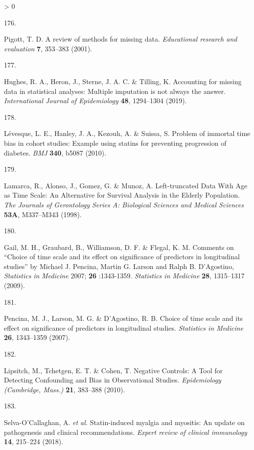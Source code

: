 \documentclass[a4paper, twoside]{templates/ociamthesis}
\newlength{\cslhangindent}
\newlength{\csllabelwidth}
\newenvironment{CSLReferences}[3] %
 {%
  \setlength{\parindent}{0pt}
  \ifodd #1 \everypar{\setlength{\hangindent}{\cslhangindent}}\ignorespaces\fi
  \ifnum #2 > 0
  \setlength{\parskip}{#2\baselineskip}
  \fi
 }%
 {}
\newcommand{\CSLLeftMargin}[1]{\parbox[t]{\maxof{\widthof{#1}}{\csllabelwidth}}{#1}}
\newcommand{\CSLRightInline}[1]{\parbox[t]{\linewidth - \csllabelwidth}{#1}}
\begin{document}
\begin{CSLReferences}{0}{0}
\leavevmode\hypertarget{ref-pigott2001review}{}%
\CSLLeftMargin{176. }
\CSLRightInline{Pigott, T. D. A review of methods for missing data. \emph{Educational research and evaluation} \textbf{7}, 353--383 (2001).}

\leavevmode\hypertarget{ref-hughes2019}{}%
\CSLLeftMargin{177. }
\CSLRightInline{Hughes, R. A., Heron, J., Sterne, J. A. C. \& Tilling, K. Accounting for missing data in statistical analyses: Multiple imputation is not always the answer. \emph{International Journal of Epidemiology} \textbf{48}, 1294--1304 (2019).}

\leavevmode\hypertarget{ref-levesque2010}{}%
\CSLLeftMargin{178. }
\CSLRightInline{Lévesque, L. E., Hanley, J. A., Kezouh, A. \& Suissa, S. Problem of immortal time bias in cohort studies: Example using statins for preventing progression of diabetes. \emph{BMJ} \textbf{340}, b5087 (2010).}

\leavevmode\hypertarget{ref-lamarca1998}{}%
\CSLLeftMargin{179. }
\CSLRightInline{Lamarca, R., Alonso, J., Gomez, G. \& Munoz, A. Left-truncated {Data With Age} as {Time Scale}: {An Alternative} for {Survival Analysis} in the {Elderly Population}. \emph{The Journals of Gerontology Series A: Biological Sciences and Medical Sciences} \textbf{53A}, M337--M343 (1998).}

\leavevmode\hypertarget{ref-gail2009}{}%
\CSLLeftMargin{180. }
\CSLRightInline{Gail, M. H., Graubard, B., Williamson, D. F. \& Flegal, K. M. Comments on {``{Choice} of time scale and its effect on significance of predictors in longitudinal studies''} by {Michael J}. {Pencina}, {Martin G}. {Larson} and {Ralph B}. {D}'{Agostino}, {\emph{Statistics}}{ \emph{in} }{\emph{Medicine}} 2007; {\textbf{26}} :1343-1359. \emph{Statistics in Medicine} \textbf{28}, 1315--1317 (2009).}

\leavevmode\hypertarget{ref-pencina2007}{}%
\CSLLeftMargin{181. }
\CSLRightInline{Pencina, M. J., Larson, M. G. \& D'Agostino, R. B. Choice of time scale and its effect on significance of predictors in longitudinal studies. \emph{Statistics in Medicine} \textbf{26}, 1343--1359 (2007).}

\leavevmode\hypertarget{ref-lipsitch2010}{}%
\CSLLeftMargin{182. }
\CSLRightInline{Lipsitch, M., Tchetgen, E. T. \& Cohen, T. Negative {Controls}: {A Tool} for {Detecting Confounding} and {Bias} in {Observational Studies}. \emph{Epidemiology (Cambridge, Mass.)} \textbf{21}, 383--388 (2010).}

\leavevmode\hypertarget{ref-selva-ocallaghan2018}{}%
\CSLLeftMargin{183. }
\CSLRightInline{Selva-O'Callaghan, A. \emph{et al.} Statin-induced myalgia and myositis: An update on pathogenesis and clinical recommendations. \emph{Expert review of clinical immunology} \textbf{14}, 215--224 (2018).}


\end{CSLReferences}
\end{document}
